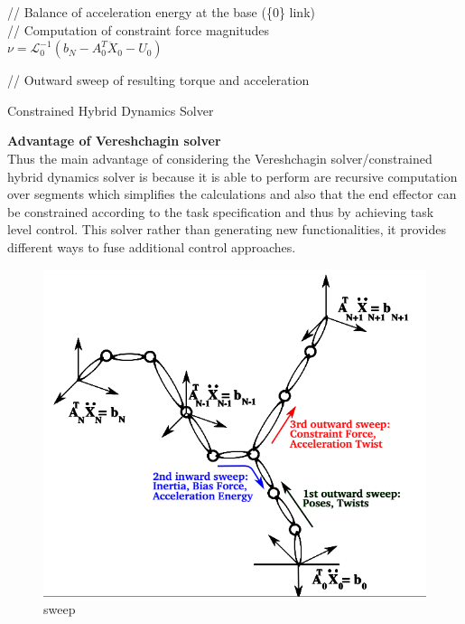 \begin{algorithm}[H]
{		\vspace{2mm}
		// Balance of acceleration energy at the base (\{0\} link)\\
		// Computation of constraint force magnitudes\\[2mm]
		$\nu = {\mathcal{L}_0^{-1}(b_N - A_0^T \ddot{X}_0 - U_0)}$\; \label{alg:balance}
		\vspace{3mm}
		
		{// Outward sweep of resulting torque and acceleration}\\
	}
	\caption{Constrained Hybrid Dynamics Solver}
\end{algorithm}
\textbf{Advantage of Vereshchagin solver} \\
Thus the main advantage of considering the Vereshchagin solver/constrained hybrid dynamics solver is because it is able to perform are recursive computation over segments which simplifies the calculations and also that the end effector can be constrained according to the task specification and thus by achieving task level control. This solver rather than generating new functionalities, it provides different ways to fuse additional control approaches.
\begin{figure}
	\centering
	\includegraphics[scale=0.4]{images/solver_1}
	\caption{sweep}
\end{figure}\\
